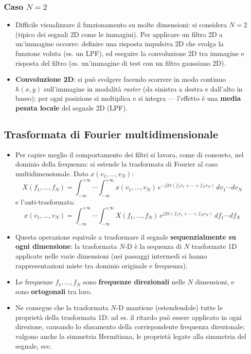 \documentclass[12pt, a4paper]{article}
\begin{document}
\subsubsection{Caso $N=2$}
\begin{itemize}
    \item Difficile visualizzare il funzionamento su molte dimensioni: si considera $N=2$ (tipico dei segnali 2D come le immagini). Per applicare un filtro 2D a un'immagine occorre: definire una risposta impulsiva 2D che svolga la funzione voluta (es. un LPF), ed eseguire la convoluzione 2D tra immagine e risposta del filtro (es. un'immagine di test con un filtro gaussiano 2D).
    \item \textbf{Convoluzione 2D}: si può svolgere facendo scorrere in modo continuo $h(x,y)$ sull'immagine in modalità \textit{raster} (da sinistra a destra e dall'alto in basso); per ogni posizione si moltiplica e si integra — l'effetto è una \textbf{media pesata locale} del segnale 2D (LPF).
\end{itemize}

\subsection{Trasformata di Fourier multidimensionale}
\begin{itemize}
    \item Per capire meglio il comportamento dei filtri si lavora, come di consueto, nel dominio della frequenza: si estende la trasformata di Fourier al caso multidimensionale. Dato $x(v_1,\dots,v_N)$:
    $$X(f_1,\dots,f_N) = \int_{-\infty}^{+\infty}\!\!\cdots\!\int_{-\infty}^{+\infty} x(v_1,\dots,v_N)\,e^{-j2\pi(f_1v_1+\cdots+f_Nv_N)}\,dv_1\cdots dv_N$$
    e l'anti-trasformata:
    $$x(v_1,\dots,v_N) = \int_{-\infty}^{+\infty}\!\!\cdots\!\int_{-\infty}^{+\infty} X(f_1,\dots,f_N)\,e^{j2\pi(f_1v_1+\cdots+f_Nv_N)}\,df_1\cdots df_N$$
    \item Questa operazione equivale a trasformare il segnale \textbf{sequenzialmente su ogni dimensione}: la trasformata $N$-D è la sequenza di $N$ trasformate 1D applicate nelle varie dimensioni (nei passaggi intermedi si hanno rappresentazioni miste tra dominio originale e frequenza).
    \item Le frequenze $f_1,\dots,f_N$ sono \textbf{frequenze direzionali} nelle $N$ dimensioni, e sono \textbf{ortogonali} tra loro.
    \item Ne consegue che la trasformata $N$-D mantiene (estendendole) tutte le proprietà della trasformata 1D: ad es. il ritardo può essere applicato in ogni direzione, causando lo sfasamento della corrispondente frequenza direzionale; valgono anche la simmetria Hermitiana, le proprietà legate alla simmetria del segnale, ecc.
\end{itemize}
\end{document}
